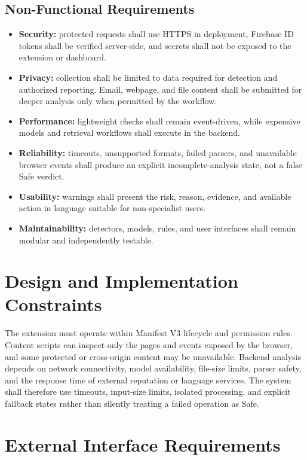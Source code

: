 \subsection{Non-Functional Requirements}
\begin{itemize}
\item \textbf{Security:} protected requests shall use HTTPS in deployment, Firebase
ID tokens shall be verified server-side, and secrets shall not be exposed to the
extension or dashboard.
\item \textbf{Privacy:} collection shall be limited to data required for detection
and authorized reporting. Email, webpage, and file content shall be submitted for
deeper analysis only when permitted by the workflow.
\item \textbf{Performance:} lightweight checks shall remain event-driven, while
expensive models and retrieval workflows shall execute in the backend.
\item \textbf{Reliability:} timeouts, unsupported formats, failed parsers, and
unavailable browser events shall produce an explicit incomplete-analysis state,
not a false Safe verdict.
\item \textbf{Usability:} warnings shall present the risk, reason, evidence, and
available action in language suitable for non-specialist users.
\item \textbf{Maintainability:} detectors, models, rules, and user interfaces shall
remain modular and independently testable.
\end{itemize}

\section{Design and Implementation Constraints}
The extension must operate within Manifest V3 lifecycle and permission rules.
Content scripts can inspect only the pages and events exposed by the browser, and
some protected or cross-origin content may be unavailable. Backend analysis depends
on network connectivity, model availability, file-size limits, parser safety, and
the response time of external reputation or language services. The system shall
therefore use timeouts, input-size limits, isolated processing, and explicit
fallback states rather than silently treating a failed operation as Safe.

\section{External Interface Requirements}
